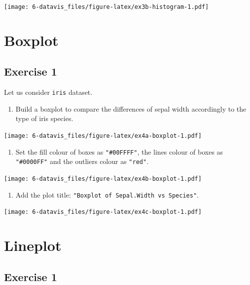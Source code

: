 \documentclass[]{book}
\providecommand{\tightlist}{%
  \setlength{\itemsep}{0pt}\setlength{\parskip}{0pt}}
\def\tightlist{}
\begin{document}
\texttt{[image: 6-datavis\_files/figure-latex/ex3b-histogram-1.pdf]}

\clearpage

\section{Boxplot}\label{boxplot}

\subsection{Exercise 1}\label{exercise-1-16}

Let us consider \texttt{iris} dataset.

\begin{enumerate}
\def\labelenumi{\alph{enumi}.}
\tightlist
\item
  Build a boxplot to compare the differences of sepal width accordingly
  to the type of iris species.
\end{enumerate}

\texttt{[image: 6-datavis\_files/figure-latex/ex4a-boxplot-1.pdf]}

\begin{enumerate}
\def\labelenumi{\alph{enumi}.}
\setcounter{enumi}{1}
\tightlist
\item
  Set the fill colour of boxes as \texttt{"\#00FFFF"}, the lines colour
  of boxes as \texttt{"\#0000FF"} and the outliers colour as
  \texttt{"red"}.
\end{enumerate}

\texttt{[image: 6-datavis\_files/figure-latex/ex4b-boxplot-1.pdf]}

\begin{enumerate}
\def\labelenumi{\alph{enumi}.}
\setcounter{enumi}{2}
\tightlist
\item
  Add the plot title: \texttt{"Boxplot\ of\ Sepal.Width\ vs\ Species"}.
\end{enumerate}

\texttt{[image: 6-datavis\_files/figure-latex/ex4c-boxplot-1.pdf]}

\clearpage

\section{Lineplot}\label{lineplot}

\subsection{Exercise 1}\label{exercise-1-17}
\end{document}
